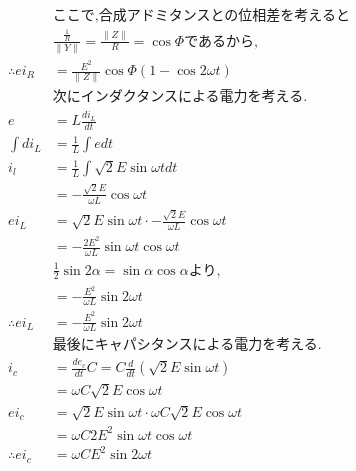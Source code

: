 \documentclass[twocolumn]{article}
\begin{document}
\begin{enumerate}
\begin{align*}
                          & \text{ここで,合成アドミタンスとの位相差を考えると}                                                           \\
                          & \frac{\frac{1}{R}}{\|Y\|} = \frac{\|Z\|}{R} = \cos \Phi\text{であるから,}                    \\
          \therefore ei_R & = \frac{E^2}{\|Z\|}\cos \Phi\left(1 - \cos 2 \omega t\right)                            \\
          &\text{次にインダクタンスによる電力を考える.}\\
          e &= L\frac{di_L}{dt}\\
          \int di_L &= \frac{1}{L} \int edt\\
          i_l &= \frac{1}{L}\int \sqrt{2}E\sin\omega t dt\\
              &= -\frac{\sqrt{2}E}{\omega L}\cos \omega t\\
          ei_L  &= \sqrt{2}E\sin\omega t \cdot -\frac{\sqrt{2}E}{\omega L}\cos \omega t\\
                &= -\frac{2E^2}{\omega L}\sin\omega t \cos \omega t\\
          &\frac{1}{2} \sin 2\alpha = \sin\alpha\cos\alpha\text{より,}\\
                &= -\frac{E^2}{\omega L}\sin 2\omega t\\
                \therefore ei_L &= -\frac{E^2}{\omega L}\sin 2\omega t\\
          &\text{最後にキャパシタンスによる電力を考える.}\\
          i_c &= \frac{de_c}{dt}C = C \frac{d}{dt}\left(\sqrt{2}E\sin\omega t\right)\\
              &= \omega C \sqrt{2}E\cos\omega t\\
          ei_c  &= \sqrt{2}E\sin \omega t \cdot \omega C \sqrt{2}E \cos \omega t\\
                &= \omega C 2 E^2 \sin \omega t \cos \omega t\\
\therefore ei_c      &= \omega C E^2 \sin 2\omega t\\
        \end{align*}


\end{enumerate}
\end{document}

